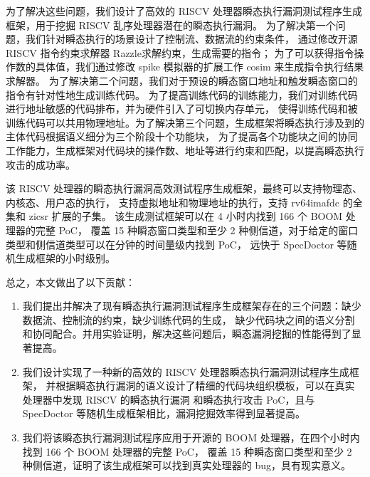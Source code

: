 为了解决这些问题，我们设计了高效的 RISCV 处理器瞬态执行漏洞测试程序生成框架，用于挖掘 RISCV 乱序处理器潜在的瞬态执行漏洞。
为了解决第一个问题，我们针对瞬态执行的场景设计了控制流、数据流的约束条件，
通过修改开源 RISCV 指令约束求解器 Razzle\cite{razzle}求解约束，生成需要的指令；
为了可以获得指令操作数的具体值，我们通过修改 spike 模拟器\cite{riscv-isa-sim}的扩展工作 cosim \cite{riscv-isa-cosim}
来生成指令执行结果求解器。
为了解决第二个问题，我们对于预设的瞬态窗口地址和触发瞬态窗口的指令有针对性地生成训练代码。
为了提高训练代码的训练能力，我们对训练代码进行地址敏感的代码排布，并为硬件引入了可切换内存单元，
使得训练代码和被训练代码可以共用物理地址。为了解决第三个问题，生成框架将瞬态执行涉及到的主体代码根据语义细分为三个阶段十个功能块，
为了提高各个功能块之间的协同工作能力，生成框架对代码块的操作数、地址等进行约束和匹配，以提高瞬态执行攻击的成功率。\par

该 RISCV 处理器的瞬态执行漏洞高效测试程序生成框架，最终可以支持物理态、内核态、用户态的执行，
支持虚拟地址和物理地址的执行，支持 rv64imafdc 的全集和 zicsr 扩展的子集\cite{riscv-isa-manual-all}。
该生成测试框架可以在 4 小时内找到 166 个 BOOM 处理器的完整 PoC，
覆盖 15 种瞬态窗口类型和至少 2 种侧信道，对于给定的窗口类型和侧信道类型可以在分钟的时间量级内找到 PoC，
远快于 SpecDoctor\cite{hur2022specdoctor} 等随机生成框架的小时级别。\par

总之，本文做出了以下贡献：\par

\begin{enumerate}
    \item 我们提出并解决了现有瞬态执行漏洞测试程序生成框架存在的三个问题：缺少数据流、控制流的约束，缺少训练代码的生成，
缺少代码块之间的语义分割和协同配合。并用实验证明，解决这些问题后，瞬态漏洞挖掘的性能得到了显著提高。\par
    \item 我们设计实现了一种新的高效的 RISCV 处理器瞬态执行漏洞测试程序生成框架，
并根据瞬态执行漏洞的语义设计了精细的代码块组织模板，可以在真实处理器中发现 RISCV 的瞬态执行漏洞
和瞬态执行攻击 PoC，且与 SpecDoctor 等随机生成框架相比，漏洞挖掘效率得到显著提高。\par
    \item 我们将该瞬态执行漏洞测试程序应用于开源的 BOOM 处理器，在四个小时内找到 166 个 BOOM 处理器的完整 PoC，
覆盖 15 种瞬态窗口类型和至少 2 种侧信道，证明了该生成框架可以找到真实处理器的 bug，具有现实意义。\par
\end{enumerate}


